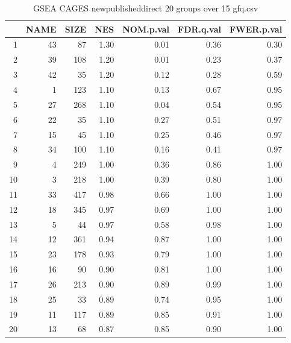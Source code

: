 \begin{table}[ht]
\centering
\begin{tabular}{rrrrrrr}
  \hline
 & NAME & SIZE & NES & NOM.p.val & FDR.q.val & FWER.p.val \\ 
  \hline
1 &  43 &  87 & 1.30 & 0.01 & 0.36 & 0.30 \\ 
  2 &  39 & 108 & 1.20 & 0.01 & 0.23 & 0.37 \\ 
  3 &  42 &  35 & 1.20 & 0.12 & 0.28 & 0.59 \\ 
  4 &   1 & 123 & 1.10 & 0.13 & 0.67 & 0.95 \\ 
  5 &  27 & 268 & 1.10 & 0.04 & 0.54 & 0.95 \\ 
  6 &  22 &  35 & 1.10 & 0.27 & 0.51 & 0.97 \\ 
  7 &  15 &  45 & 1.10 & 0.25 & 0.46 & 0.97 \\ 
  8 &  34 & 100 & 1.10 & 0.16 & 0.41 & 0.97 \\ 
  9 &   4 & 249 & 1.00 & 0.36 & 0.86 & 1.00 \\ 
  10 &   3 & 218 & 1.00 & 0.39 & 0.80 & 1.00 \\ 
  11 &  33 & 417 & 0.98 & 0.66 & 1.00 & 1.00 \\ 
  12 &  18 & 345 & 0.97 & 0.69 & 1.00 & 1.00 \\ 
  13 &   5 &  44 & 0.97 & 0.58 & 0.98 & 1.00 \\ 
  14 &  12 & 361 & 0.94 & 0.87 & 1.00 & 1.00 \\ 
  15 &  23 & 178 & 0.93 & 0.79 & 1.00 & 1.00 \\ 
  16 &  16 &  90 & 0.90 & 0.81 & 1.00 & 1.00 \\ 
  17 &  26 & 213 & 0.90 & 0.89 & 0.99 & 1.00 \\ 
  18 &  25 &  33 & 0.89 & 0.74 & 0.95 & 1.00 \\ 
  19 &  11 & 117 & 0.89 & 0.85 & 0.91 & 1.00 \\ 
  20 &  13 &  68 & 0.87 & 0.85 & 0.90 & 1.00 \\ 
   \hline
\end{tabular}
\caption{GSEA CAGES newpublisheddirect 20 groups over 15 gfq.csv} 
\label{gfq.csv}
\end{table}

